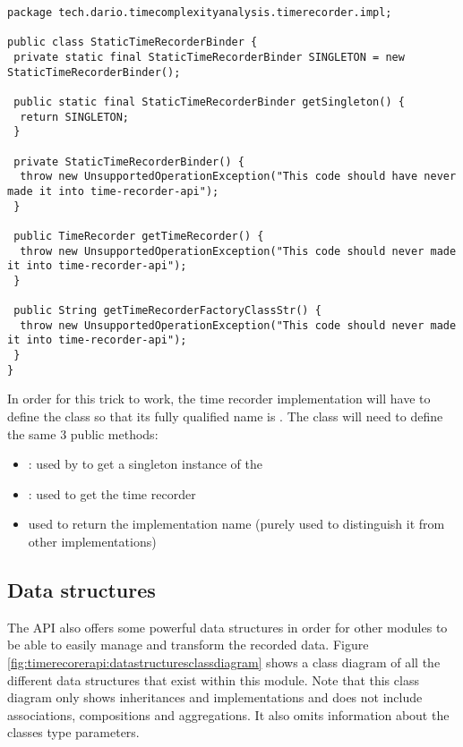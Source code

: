 \begin{lstlisting}[breaklines,caption={StaticTimeRecorderBinder dummy implementation},label=lis:timerecorderapi:statictimerecorderbinderdummy]
package tech.dario.timecomplexityanalysis.timerecorder.impl;

public class StaticTimeRecorderBinder {
 private static final StaticTimeRecorderBinder SINGLETON = new StaticTimeRecorderBinder();

 public static final StaticTimeRecorderBinder getSingleton() {
  return SINGLETON;
 }

 private StaticTimeRecorderBinder() {
  throw new UnsupportedOperationException("This code should have never made it into time-recorder-api");
 }

 public TimeRecorder getTimeRecorder() {
  throw new UnsupportedOperationException("This code should never made it into time-recorder-api");
 }

 public String getTimeRecorderFactoryClassStr() {
  throw new UnsupportedOperationException("This code should never made it into time-recorder-api");
 }
}
\end{lstlisting}

\noindent In order for this trick to work, the time recorder implementation will have to define the class so that its fully qualified name is . The class will need to define the same 3 public methods:

\begin{itemize}
  \item \textbf{  }: used by  to get a singleton instance of the 
  \item \textbf{ }: used to get the time recorder
  \item \textbf{ } used to return the implementation name (purely used to distinguish it from other implementations)
\end{itemize}

\subsection{Data structures}
\label{sec:implementation:timerecorderapi:datastructures}

The API also offers some powerful data structures in order for other modules to be able to easily manage and transform the recorded data. Figure \ref{fig:timerecorerapi:datastructuresclassdiagram} shows a class diagram of all the different data structures that exist within this module. Note that this class diagram only shows inheritances and implementations and does not include associations, compositions and aggregations. It also omits information about the classes type parameters.

